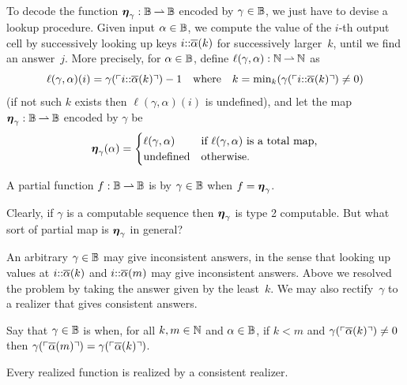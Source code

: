 To decode the function $\text{\boldmath{$\eta$}}_\gamma : \mathbb{B} \mathbin{\rightharpoonup} \mathbb{B}$ encoded by $\gamma \in \mathbb{B}$, we just have to devise a lookup procedure. Given input $\alpha \in \mathbb{B}$, we compute the value of the $i$-th output cell by successively looking up keys $i {:}{:} \overline{\alpha}(k)$ for successively larger~$k$, until we find an answer~$j$. More precisely,
for $\alpha \in \mathbb{B}$, define $\ell(\gamma, \alpha) : \mathbb{N} \mathbin{\rightharpoonup} \mathbb{N}$ as
%
\begin{equation*}
  \ell(\gamma, \alpha)(i) = \gamma(\ulcorner i {:}{:} \overline{\alpha}(k) \urcorner) - 1
  \quad\text{where}\quad
  k = \min\nolimits_k (\gamma(\ulcorner i {:}{:} \overline{\alpha}(k) \urcorner) \neq 0)
\end{equation*}
%
(if not such $k$ exists then $\ell(\gamma, \alpha)(i)$ is undefined), and let the map $\text{\boldmath{$\eta$}}_\gamma : \mathbb{B} \mathbin{\rightharpoonup} \mathbb{B}$ encoded by $\gamma$ be
%
\begin{equation}
  \label{eq:type2-encoding}
  \text{\boldmath{$\eta$}}_\gamma(\alpha) =
  \begin{cases}
    \ell(\gamma, \alpha) & \text{if $\ell(\gamma, \alpha)$ is a total map,} \\
    \text{undefined} & \text{otherwise.}
  \end{cases}
\end{equation}

\begin{definition}
  \label{def:type-2-realized}%
  A partial function $f : \mathbb{B} \mathbin{\rightharpoonup} \mathbb{B}$ is  by $\gamma \in \mathbb{B}$ when $f = \text{\boldmath{$\eta$}}_\gamma$.
\end{definition}

Clearly, if $\gamma$ is a computable sequence then $\text{\boldmath{$\eta$}}_\gamma$ is type 2 computable.
But what sort of partial map is $\text{\boldmath{$\eta$}}_\gamma$ in general?

An arbitrary $\gamma \in \mathbb{B}$ may give inconsistent answers, in the sense that looking up values at $i {:}{:} \overline{\alpha}(k)$ and $i {:}{:} \overline{\alpha}(m)$ may give inconsistent answers. Above we resolved the problem by taking the answer given by the least~$k$. We may also rectify~$\gamma$ to a realizer that gives consistent answers.

Say that $\gamma \in \mathbb{B}$ is  when, for all $k, m \in \mathbb{N}$ and
$\alpha \in \mathbb{B}$, if $k < m$ and $\gamma(\ulcorner \overline{\alpha}(k) \urcorner) \neq 0$ then
$\gamma(\ulcorner \overline{\alpha}(m) \urcorner) = \gamma(\ulcorner \overline{\alpha}(k) \urcorner)$.

\begin{lemma}
  \label{lemma:normalized-BB}%
  Every realized function is realized by a consistent realizer.
\end{lemma}

